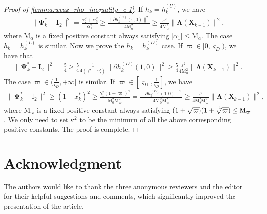 \documentclass[final,onefignum,onetabnum]{siamart190516}
\newcommand{\matr}[1]{\boldsymbol{#1}}
\newcommand{\Utwo}{\Psi}
\begin{document}
\begin{proof}[Proof of \cref{lemma:weak_rho_inequality_c-1}]
If $h_k=h^{(U)}_{k}$, we have
\begin{align*}
\|\matr{\Utwo}^{*}_{k}-\matr{I}_{2}\|^2=\frac{\alpha_2^2+\alpha_3^2}{\alpha_1^2}\geq \frac{\|\partial h^{(U)}_{k}(0,0)\|^2}{4\mathrm{M}_{\alpha}^2}\geq \frac{\varepsilon^2}{4\mathrm{M}_{\alpha}^2}\|\matr{\Lambda}(\matr{X}_{k-1})\|^2,
\end{align*}
where $\mathrm{M}_{\alpha}$ is a fixed positive constant always satisfying $|\alpha_1|\leq\mathrm{M}_{\alpha}$. 
The case $h_k=h^{(L)}_{k}$ is similar.
Now we prove the $h_k=h^{(D)}_{k}$ case. If $\varpi\in[0,\varsigma_{D})$, we have that 
\begin{align*}
\|\matr{\Utwo}^{*}_{k}-\matr{I}_{2}\|^2=\frac{5}{4}\geq\frac{5}{4}\frac{1}{4(\gamma_1^2+\gamma_2^2)}
\|\partial h^{(D)}_{k}(1,0)\|^2\geq\frac{5}{4}\frac{\varepsilon^2}{4\mathrm{M}_{0}^2}
\|\matr{\Lambda}(\matr{X}_{k-1})\|^2.
\end{align*}
The case $\varpi\in(\frac{1}{\varsigma_{D}},+\infty]$ is similar.
If $\varpi\in [\varsigma_{D},\frac{1}{\varsigma_{D}}]$, we have 
\begin{align*}
\|\matr{\Utwo}^{*}_{k}-\matr{I}_{2}\|^2\geq (1-x_k^{*})^2\geq \frac{\gamma_1^2(1-\varpi)^2}{\mathrm{M}_{0}^2\mathrm{M}_\varpi^2}=\frac{\|\partial h^{(D)}_{k}(1,0)\|^2}{4\mathrm{M}_{0}^2\mathrm{M}_\varpi^2}\geq\frac{\varepsilon^2}{4\mathrm{M}_{0}^2\mathrm{M}_\varpi^2}\|\matr{\Lambda}(\matr{X}_{k-1})\|^2,
\end{align*}
where $\mathrm{M}_\varpi$ is a fixed positive constant always satisfying $(1+\sqrt{\varpi})(1+\sqrt[\leftroot{-2}\uproot{4}4]{\varpi})\leq\mathrm{M}_\varpi$. 
We only need to set $\kappa^2$ to be the minimum of all the above corresponding positive constants. 
The proof is complete. 
\end{proof}


\section*{Acknowledgment} 
The authors would like to thank the three anonymous reviewers and the editor for their helpful suggestions and comments, which significantly improved the presentation of the article. 




\end{document}
